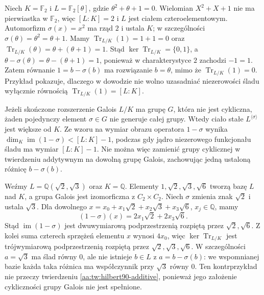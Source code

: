 \begin{przyklad}
Niech $K=\mathbb F_2$ i
$L=\mathbb F_2[\theta]$, gdzie $\theta^2+\theta+1=0$.
Wielomian $X^2+X+1$ nie ma pierwiastka w $\mathbb F_2$,
więc $[L:K]=2$ i $L$ jest ciałem czteroelementowym.
Automorfizm $\sigma(x)=x^2$ ma rząd $2$ i ustala $K$;
w szczególności $\sigma(\theta)=\theta^2=\theta+1$.
Mamy $\operatorname{Tr}_{L/K}(1)=1+1=0$ oraz
$\operatorname{Tr}_{L/K}(\theta)=\theta+(\theta+1)=1$.
Stąd $\ker\operatorname{Tr}_{L/K}=\{0,1\}$, a
$\theta-\sigma(\theta)=\theta-(\theta+1)=1$,
ponieważ w charakterystyce $2$ zachodzi $-1=1$.
Zatem równanie $1=b-\sigma(b)$ ma rozwiązanie $b=\theta$,
mimo że $\operatorname{Tr}_{L/K}(1)=0$.
Przykład pokazuje, dlaczego w dowodzie nie wolno uzasadniać
niezerowości śladu wyłącznie równością
$\operatorname{Tr}_{L/K}(1)=[L:K]$.
\end{przyklad}

\begin{uwaga}\label{aa:uw:hilbert90-cyclic}
Jeżeli skończone rozszerzenie Galois $L/K$ ma grupę
$G$, która nie jest cykliczna, żaden pojedynczy element
$\sigma\in G$ nie generuje całej grupy. Wtedy ciało stałe
$L^{\langle\sigma\rangle}$ jest większe od $K$.
Ze wzoru na wymiar obrazu operatora $1-\sigma$ wynika
$\dim_K\operatorname{im}(1-\sigma)<[L:K]-1$,
podczas gdy jądro niezerowego funkcjonału śladu ma wymiar
$[L:K]-1$. Nie można więc zamienić grupy cyklicznej
w twierdzeniu addytywnym na dowolną grupę Galois,
zachowując jedną ustaloną różnicę $b-\sigma(b)$.
\end{uwaga}

\begin{przyklad}\label{aa:prz:hilbert90-noncyclic}
Weźmy $L=\mathbb Q(\sqrt2,\sqrt3)$ oraz $K=\mathbb Q$.
Elementy $1,\sqrt2,\sqrt3,\sqrt6$ tworzą bazę $L$ nad $K$,
a grupa Galois jest izomorficzna z $C_2\times C_2$.
Niech $\sigma$ zmienia znak $\sqrt2$ i ustala $\sqrt3$.
Dla dowolnego
$x=x_0+x_1\sqrt2+x_2\sqrt3+x_3\sqrt6$,
$x_j\in\mathbb Q$, mamy
\[
(1-\sigma)(x)=2x_1\sqrt2+2x_3\sqrt6.
\]
Stąd $\operatorname{im}(1-\sigma)$ jest dwuwymiarową
podprzestrzenią rozpiętą przez $\sqrt2,\sqrt6$.
Z kolei suma czterech sprzężeń elementu $x$ wynosi $4x_0$,
więc $\ker\operatorname{Tr}_{L/K}$ jest trójwymiarową
podprzestrzenią rozpiętą przez $\sqrt2,\sqrt3,\sqrt6$.
W szczególności $a=\sqrt3$ ma ślad równy $0$,
ale nie istnieje $b\in L$ z $a=b-\sigma(b)$:
we wspomnianej bazie każda taka różnica ma współczynnik
przy $\sqrt3$ równy $0$.
Ten kontrprzykład nie przeczy twierdzeniu
\ref{aa:tw:hilbert90-additive}, ponieważ jego założenie
cykliczności grupy Galois nie jest spełnione.
\end{przyklad}
